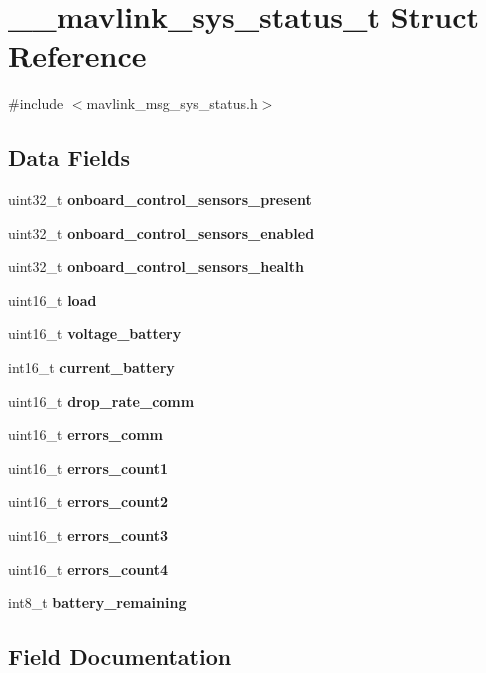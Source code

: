 \section{\+\_\+\+\_\+mavlink\+\_\+sys\+\_\+status\+\_\+t Struct Reference}
\label{struct____mavlink__sys__status__t}


{\ttfamily \#include $<$mavlink\+\_\+msg\+\_\+sys\+\_\+status.\+h$>$}

\subsection*{Data Fields}
\begin{DoxyCompactItemize}
\item 
uint32\+\_\+t \textbf{ onboard\+\_\+control\+\_\+sensors\+\_\+present}
\item 
uint32\+\_\+t \textbf{ onboard\+\_\+control\+\_\+sensors\+\_\+enabled}
\item 
uint32\+\_\+t \textbf{ onboard\+\_\+control\+\_\+sensors\+\_\+health}
\item 
uint16\+\_\+t \textbf{ load}
\item 
uint16\+\_\+t \textbf{ voltage\+\_\+battery}
\item 
int16\+\_\+t \textbf{ current\+\_\+battery}
\item 
uint16\+\_\+t \textbf{ drop\+\_\+rate\+\_\+comm}
\item 
uint16\+\_\+t \textbf{ errors\+\_\+comm}
\item 
uint16\+\_\+t \textbf{ errors\+\_\+count1}
\item 
uint16\+\_\+t \textbf{ errors\+\_\+count2}
\item 
uint16\+\_\+t \textbf{ errors\+\_\+count3}
\item 
uint16\+\_\+t \textbf{ errors\+\_\+count4}
\item 
int8\+\_\+t \textbf{ battery\+\_\+remaining}
\end{DoxyCompactItemize}


\subsection{Field Documentation}
\mbox{\label{struct____mavlink__sys__status__t_a1e7d9b9d64f0df7c0fd5eaf56154986b}} 
